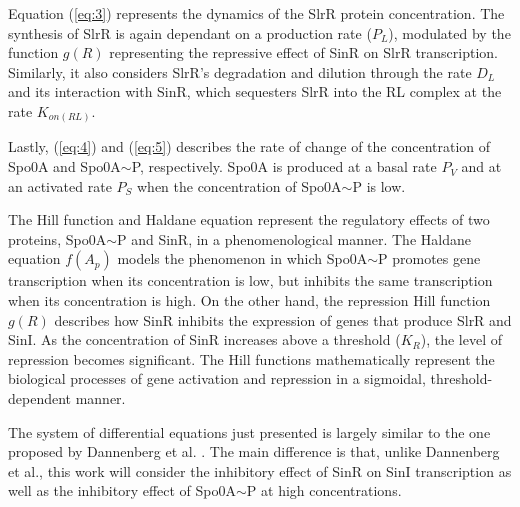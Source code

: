 Equation (\ref{eq:3}) represents the dynamics of the SlrR protein concentration. 
The synthesis of SlrR is again dependant on a production rate ($P_L$), modulated by the function $g(R)$ representing the repressive effect of SinR on SlrR transcription. Similarly, it also considers SlrR's degradation and dilution through the rate $D_L$ and its interaction with SinR, which sequesters SlrR into the RL complex at the rate $K_{on(RL)}$.

Lastly, (\ref{eq:4}) and (\ref{eq:5}) 
describes the rate of change of the concentration of Spo0A and Spo0A$\sim$P, respectively.
Spo0A
is produced at a basal rate $P_V$ and at an activated rate $P_S$ when the concentration of Spo0A$\sim$P is low. 

The Hill function and Haldane equation represent the regulatory effects of two proteins, Spo0A$\sim$P and SinR, 
in a phenomenological manner.
 The Haldane equation \( f(A_p) \) models the phenomenon in which Spo0A$\sim$P promotes gene transcription
 when its concentration is low, but inhibits the same transcription when its concentration is high.
  On the other hand, the repression Hill function \( g(R) \) describes how SinR 
  inhibits the expression of genes that produce SlrR and SinI.
   As the concentration of SinR increases above a threshold ($K_R$), the level 
   of repression becomes significant. The Hill functions mathematically represent the biological
    processes of gene activation and repression in a sigmoidal, threshold-dependent manner.

The system of differential equations just presented is largely similar to the one proposed by Dannenberg et al. {\footnotesize\cite{simon}}. 
The main difference is that, unlike Dannenberg et al., 
this work will consider the inhibitory effect of SinR on SinI transcription as well as the inhibitory effect of
Spo0A$\sim$P at high concentrations.

